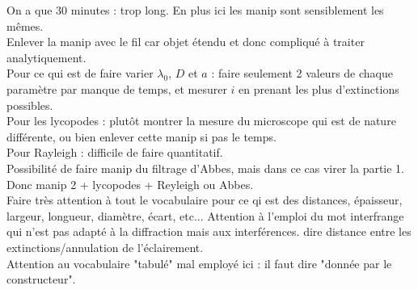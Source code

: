 \documentclass[12pt,prb,aps,epsf]{report}
\begin{document}
On a que 30 minutes : trop long. En plus ici les manip sont sensiblement les mêmes.\\
Enlever la manip avec le fil car objet étendu et donc compliqué à traiter analytiquement.\\
Pour ce qui est de faire varier $\lambda_0$, $D$ et $a$ : faire seulement 2 valeurs de chaque paramètre par manque de temps, et mesurer $i$ en prenant les plus d'extinctions possibles.\\
Pour les lycopodes : plutôt montrer la mesure du microscope qui est de nature différente, ou bien enlever cette manip si pas le temps.\\
Pour Rayleigh : difficile de faire quantitatif. \\
Possibilité de faire manip du filtrage d'Abbes, mais dans ce cas virer la partie 1.\\
Donc manip 2 + lycopodes + Reyleigh ou Abbes.\\

Faire très attention à tout le vocabulaire pour ce qi est des distances, épaisseur, largeur, longueur, diamètre, écart, etc... Attention à l'emploi du mot interfrange qui n'est pas adapté à la diffraction mais aux interférences. dire distance entre les extinctions/annulation de l'éclairement.\\
Attention au vocabulaire "tabulé" mal employé ici : il faut dire "donnée par le constructeur".
\end{document}
